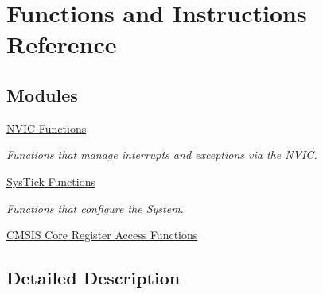 \hypertarget{group___c_m_s_i_s___core___function_interface}{}\section{Functions and Instructions Reference}
\label{group___c_m_s_i_s___core___function_interface}
\subsection*{Modules}
\begin{DoxyCompactItemize}
\item 
\hyperlink{group___c_m_s_i_s___core___n_v_i_c_functions}{N\+V\+I\+C Functions}
\begin{DoxyCompactList}\small\item\em Functions that manage interrupts and exceptions via the N\+V\+I\+C. \end{DoxyCompactList}\item 
\hyperlink{group___c_m_s_i_s___core___sys_tick_functions}{Sys\+Tick Functions}
\begin{DoxyCompactList}\small\item\em Functions that configure the System. \end{DoxyCompactList}\item 
\hyperlink{group___c_m_s_i_s___core___reg_acc_functions}{C\+M\+S\+I\+S Core Register Access Functions}
\end{DoxyCompactItemize}


\subsection{Detailed Description}

